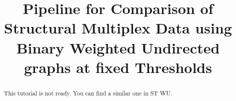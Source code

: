 \documentclass[justified]{tufte-handout}
\title{Pipeline for Comparison of Structural Multiplex Data using Binary Weighted Undirected graphs at fixed Thresholds}
\begin{document}
\maketitle

\begin{abstract}
\noindent
This tutorial is not ready. You can find a similar one in ST WU.
\end{abstract}
\end{document}
